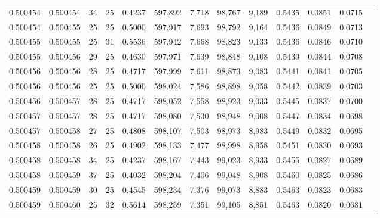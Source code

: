 \begin{tabular}{rrrrrrrrrrrrr}
0.500454 & 0.500454 &    34 &  25 &                                     0.4237 & 597,892 &   7,718 &  98,767 &   9,189 & 0.5435 & 0.0851 & 0.0715 \\
0.500454 & 0.500455 &    25 &  25 &                                     0.5000 & 597,917 &   7,693 &  98,792 &   9,164 & 0.5436 & 0.0849 & 0.0713 \\
0.500455 & 0.500455 &    25 &  31 &                                     0.5536 & 597,942 &   7,668 &  98,823 &   9,133 & 0.5436 & 0.0846 & 0.0710 \\
0.500455 & 0.500456 &    29 &  25 &                                     0.4630 & 597,971 &   7,639 &  98,848 &   9,108 & 0.5439 & 0.0844 & 0.0708 \\
0.500456 & 0.500456 &    28 &  25 &                                     0.4717 & 597,999 &   7,611 &  98,873 &   9,083 & 0.5441 & 0.0841 & 0.0705 \\
0.500456 & 0.500456 &    25 &  25 &                                     0.5000 & 598,024 &   7,586 &  98,898 &   9,058 & 0.5442 & 0.0839 & 0.0703 \\
0.500456 & 0.500457 &    28 &  25 &                                     0.4717 & 598,052 &   7,558 &  98,923 &   9,033 & 0.5445 & 0.0837 & 0.0700 \\
0.500457 & 0.500457 &    28 &  25 &                                     0.4717 & 598,080 &   7,530 &  98,948 &   9,008 & 0.5447 & 0.0834 & 0.0698 \\
0.500457 & 0.500458 &    27 &  25 &                                     0.4808 & 598,107 &   7,503 &  98,973 &   8,983 & 0.5449 & 0.0832 & 0.0695 \\
0.500458 & 0.500458 &    26 &  25 &                                     0.4902 & 598,133 &   7,477 &  98,998 &   8,958 & 0.5451 & 0.0830 & 0.0693 \\
0.500458 & 0.500458 &    34 &  25 &                                     0.4237 & 598,167 &   7,443 &  99,023 &   8,933 & 0.5455 & 0.0827 & 0.0689 \\
0.500458 & 0.500459 &    37 &  25 &                                     0.4032 & 598,204 &   7,406 &  99,048 &   8,908 & 0.5460 & 0.0825 & 0.0686 \\
0.500459 & 0.500459 &    30 &  25 &                                     0.4545 & 598,234 &   7,376 &  99,073 &   8,883 & 0.5463 & 0.0823 & 0.0683 \\
0.500459 & 0.500460 &    25 &  32 &                                     0.5614 & 598,259 &   7,351 &  99,105 &   8,851 & 0.5463 & 0.0820 & 0.0681 \\

\end{tabular}
